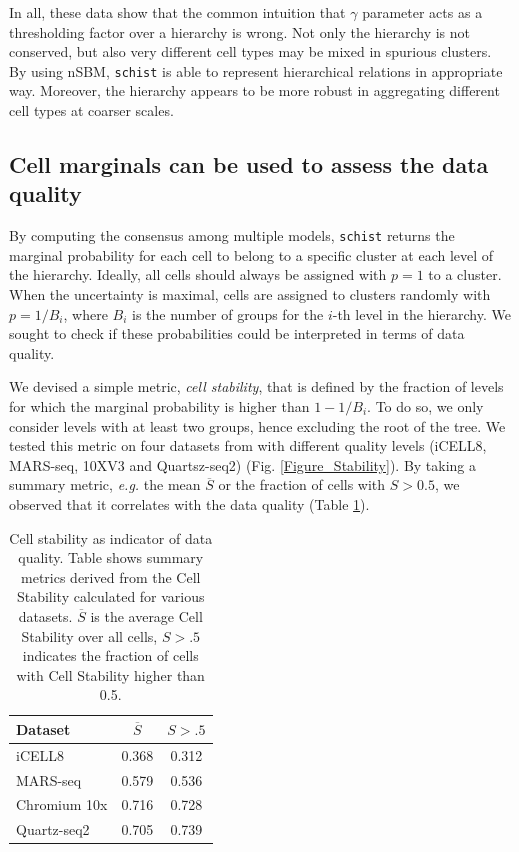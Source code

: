 \documentclass[10pt]{article}
\begin{document}
In all, these data show that the common intuition that $\gamma$ parameter acts as a thresholding factor over a hierarchy is wrong. Not only the hierarchy is not conserved, but also very different cell types may be mixed in spurious clusters. By using nSBM, \texttt{schist} is able to represent hierarchical relations in appropriate way. Moreover, the hierarchy appears to be more robust in aggregating different cell types at coarser scales.

\subsection*{Cell marginals can be used to assess the data quality}

By computing the consensus among multiple models, \texttt{schist} returns the marginal probability for each cell to belong to a specific cluster at each level of the hierarchy. Ideally, all cells should always be assigned with $p=1$ to a cluster. When the uncertainty is maximal, cells are assigned to clusters randomly with $p=1/B_i$, where $B_i$ is the number of groups for the $i$-th level in the hierarchy. We sought to check if these probabilities could be interpreted in terms of data quality. 

We devised a simple metric, \emph{cell stability}, that is defined by the fraction of levels for which the marginal probability is higher than $1-1/B_i$. To do so, we only consider levels with at least two groups, hence excluding the root of the tree. We tested this metric on four datasets from \cite{mereu_2020} with different quality levels (iCELL8, MARS-seq, 10XV3 and Quartsz-seq2) (Fig. \ref{Figure_Stability}). By taking a summary metric, \emph{e.g.} the mean $\overline{S}$ or the fraction of cells with $S>0.5$, we observed that it correlates with the data quality (Table \ref{table_stability}).

\begin{table}[h!]
\centering
 \begin{tabular}{|| l c c ||}
 \hline
 \textbf{Dataset} & \textbf{$\overline{S}$} & \textbf{$S > .5$} \\ [0.5ex] 

 \hline\hline
 iCELL8 \cite{mereu_2020} & 0.368 & 0.312  \\
 \hline
 MARS-seq \cite{mereu_2020} & 0.579 & 0.536  \\
 \hline
 Chromium 10x \cite{mereu_2020} & 0.716 & 0.728  \\
 \hline
 Quartz-seq2 \cite{mereu_2020} & 0.705 & 0.739 \\
 \hline
\end{tabular}
\caption{Cell stability as indicator of data quality. Table shows summary metrics derived from the Cell Stability calculated for various datasets. $\overline{S}$ is the average Cell Stability over all cells, $S>.5$ indicates the fraction of cells with Cell Stability higher than 0.5.}
\label{table_stability}
\end{table}
\end{document}
